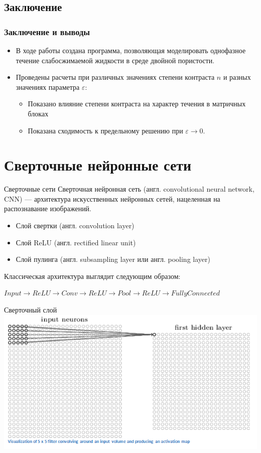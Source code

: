 \documentclass[unicode,aspectratio=43]{beamer}
\def \ve{\varepsilon} %
\begin{document}
\subsection{Заключение}

\begin{frame}\frametitle{Заключение и выводы}
\begin{itemize}
\item В ходе работы создана программа, позволяющая моделировать однофазное течение слабосжимаемой жидкости в среде двойной пористости.
\item Проведены расчеты при различных значениях степени контраста $n$ и разных значениях параметра $\ve$:
\begin{itemize} 
\item Показано влияние степени контраста на характер течения в матричных блоках
\item Показана сходимость к предельному решению при $\ve \to 0$.
\end{itemize} 
\end{itemize}
\end{frame}

\section{Сверточные нейронные сети}

\begin{frame}{Сверточные сети}
	Сверточная нейронная сеть (англ. convolutional neural network, CNN) — архитектура искусственных нейронных сетей, нацеленная на распознавание изображений. 
	\begin{itemize} 
		\item Слой свертки (англ. convolution layer)
		\item Слой ReLU (англ. rectified linear unit) 
		\item Слой пулинга (англ. subsampling layer или англ. pooling layer)
	\end{itemize}
	Классическая архитектура выглядит следующим образом: 
	
	$Input \rightarrow  ReLU \rightarrow Conv \rightarrow ReLU \rightarrow Pool \rightarrow ReLU \rightarrow Fully Connected$
\end{frame}

\begin{frame}{Сверточный слой}
	\includegraphics[scale=0.5]{1}
\end{frame}
\end{document}
